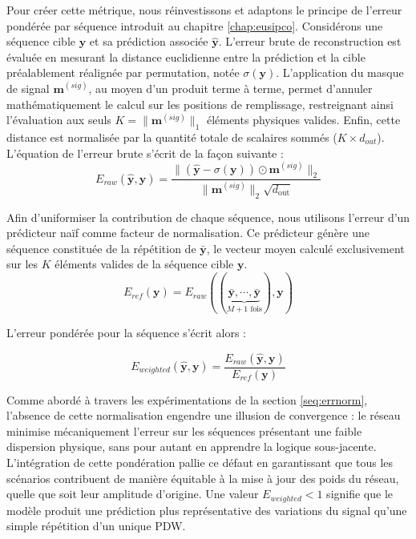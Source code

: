 Pour créer cette métrique, nous réinvestissons et adaptons le principe de l'erreur pondérée par séquence introduit au chapitre \ref{chap:eusipco}. Considérons une séquence cible $\mathbf{y}$ et sa prédiction associée $\hat{\mathbf{y}}$. L'erreur brute de reconstruction est évaluée en mesurant la distance euclidienne entre la prédiction et la cible préalablement réalignée par permutation, notée $\sigma(\mathbf{y})$.
L'application du masque de signal $\mathbf{m}^{(sig)}$, au moyen d'un produit terme à terme, permet d'annuler mathématiquement le calcul sur les positions de remplissage, restreignant ainsi l'évaluation aux seuls $K = \|\mathbf{m}^{(sig)}\|_1$ éléments physiques valides. Enfin, cette distance est normalisée par la quantité totale de scalaires sommés ($K \times d_{out}$).
L'équation de l'erreur brute s'écrit de la façon suivante :\\
\begin{equation}
\label{eq:Eraw}
E_{raw}(\hat{\mathbf{y}}, \mathbf{y}) = \frac{\|(\hat{\mathbf{y}} - \sigma(\mathbf{y})) \odot \mathbf{m}^{(sig)}\|_2}{\|\mathbf{m}^{(sig)}\|_2 \sqrt{d_{\text{out}}}}
\end{equation}

Afin d'uniformiser la contribution de chaque séquence, nous utilisons l'erreur d'un prédicteur naïf comme facteur de normalisation. Ce prédicteur génère une séquence constituée de la répétition de $\bar{\mathbf{y}}$, le vecteur moyen calculé exclusivement sur les $K$ éléments valides de la séquence cible $\mathbf{y}$.\\

\begin{equation}
\label{eq:Eref}
E_{ref}(\mathbf{y}) = E_{raw}((\underbrace{\bar{\mathbf{y}}, \cdots, \bar{\mathbf{y}}}_{M+1 \text{ fois}}), \mathbf{y})
\end{equation}

L'erreur pondérée pour la séquence s'écrit alors :

\begin{equation}
\label{eq:Ewei}
E_{weighted}(\hat{\mathbf{y}}, \mathbf{y}) = \frac{E_{raw}(\hat{\mathbf{y}}, \mathbf{y})}{E_{ref}(\mathbf{y})}
\end{equation}

Comme abordé à travers les expérimentations de la section \ref{seq:errnorm}, l'absence de cette normalisation engendre une illusion de convergence : le réseau minimise mécaniquement l'erreur sur les séquences présentant une faible dispersion physique, sans pour autant en apprendre la logique sous-jacente. L'intégration de cette pondération pallie ce défaut en garantissant que tous les scénarios contribuent de manière équitable à la mise à jour des poids du réseau, quelle que soit leur amplitude d'origine. Une valeur $E_{weighted} < 1$ signifie que le modèle produit une prédiction plus représentative des variations du signal qu'une simple répétition d'un unique PDW.\\

